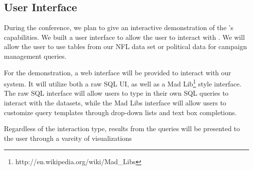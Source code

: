 \subsection{User Interface}


During the conference, we plan to give an interactive demonstration of the 
{\system}'s capabilities.
We built a user interface to allow the user to interact with \system. 
We will allow the user to use tables from our NFL data set or political data
for campaign management queries.



For the demonstration, a web interface will be provided to interact with our
system. It will utilize both a raw SQL UI, as well as a Mad
Lib\footnote{http://en.wikipedia.org/wiki/Mad\_Libs} style interface. The raw
SQL interface will allow users to type in their own SQL queries to interact with
the datasets, while the Mad Libs interface will allow users to customize query
templates through drop-down lists and text box completions.

Regardless of the interaction type, results from the queries will be presented 
to the user through a vareity of visualizations


